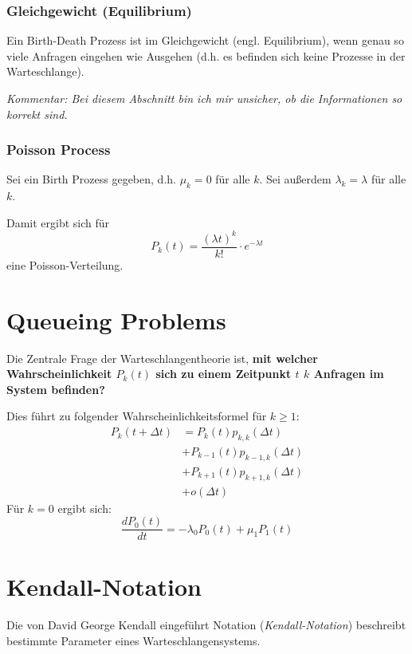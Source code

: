 			\subsubsection{Gleichgewicht (Equilibrium)} %
				Ein Birth-Death Prozess ist im Gleichgewicht (engl. Equilibrium), wenn genau so viele Anfragen eingehen wie Ausgehen (d.h. es befinden sich keine Prozesse in der Warteschlange).

				\textit{Kommentar: Bei diesem Abschnitt bin ich mir unsicher, ob die Informationen so korrekt sind.} 

			\subsubsection{Poisson Process} %
				Sei ein Birth Prozess gegeben, d.h. \( \mu _ k = 0 \) für alle \(k\). Sei außerdem \( \lambda _ k = \lambda \) für alle \(k\).

				Damit ergibt sich für \[ P _ k (t) = \frac{(\lambda t ) ^ k}{k!} \cdot e ^ { -\lambda t } \] eine Poisson-Verteilung.

	\section{Queueing Problems}
		Die Zentrale Frage der Warteschlangentheorie ist, \textbf{mit welcher Wahrscheinlichkeit \(P_k(t)\) sich zu einem Zeitpunkt \(t\) \(k\) Anfragen im System befinden?}

		Dies führt zu folgender Wahrscheinlichkeitsformel für \(k \geq 1\):
		\begin{align*}
			P _ k (t + \Delta t) & = P _ k (t) p _ {k, k} (\Delta t)           \\
			                     & + P _ {k - 1} (t) p _ {k - 1, k} (\Delta t) \\
			                     & + P _ {k + 1} (t) p _ {k + 1, k} (\Delta t) \\
			                     & + o(\Delta t)
		\end{align*}
		Für \(k = 0\) ergibt sich:
		\begin{equation*}
			\frac{d P _ 0 (t)}{dt} = -\lambda _ 0 P _ 0 (t) + \mu _ 1 P _ 1 (t)
		\end{equation*}

	\section{Kendall-Notation}
		Die von David George Kendall eingeführt Notation (\textit{Kendall-Notation}) beschreibt bestimmte Parameter eines Warteschlangensystems.

